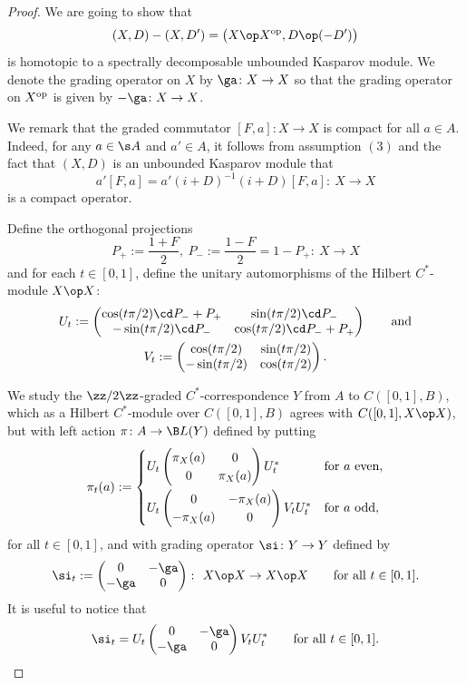\begin{proof}
We are going to show that
\[
(X,D) - (X, D') = \big(X \op X^{{\rm op}}, D \op (- D') \big)
\]
is homotopic to a spectrally decomposable unbounded Kasparov module. We denote the grading operator on $X$ by $\ga\colon X \to X$ so that the grading operator on $X^{{\rm op}}$ is given by $-\ga\colon X \to X$.

We remark that the graded commutator $[F,a]\colon X \to X$ is compact for all $a \in A$. Indeed, for any $a \in \s A$ and $a' \in A$, it follows from assumption $(3)$ and the fact that $(X,D)$ is an unbounded Kasparov module that
\[
a' [F,a] = a' (i + D)^{-1} (i + D) [F,a]\colon \ X \to X
\]
is a compact operator.

Define the orthogonal projections
\[
P_+ := \frac{1 + F}{2} , \ P_- := \frac{1 - F}{2} = 1 - P_+\colon \ X \to X
\]
and for each $t \in [0,1]$, define the unitary automorphisms of the Hilbert $C^*$-module $X \op X$:
\begin{gather}
U_t := \left(\begin{matrix} \cos(t \pi/ 2) \cd P_- + P_+ & \sin(t \pi/2) \cd P_- \\ - \sin(t \pi/2) \cd P_- & \cos(t \pi/2) \cd P_- + P_+\end{matrix}\right) \qquad \text{and} \nonumber\\
V_t := \left(\begin{matrix} \cos(t \pi/ 2) & \sin(t \pi/2) \\ - \sin(t \pi/2) & \cos(t \pi/2) \end{matrix}\right) .\label{eq:unitary}
\end{gather}

We study the $\zz/2\zz$-graded $C^*$-correspondence $Y$ from $A$ to $C([0,1],B)$, which as a Hilbert $C^*$-module over $C([0,1],B)$ agrees with $C( [0,1],X \op X)$, but with left action $\pi\colon A \to \B L(Y)$ defined by putting
\[
\pi_t(a) := \begin{cases} U_t \left(\begin{matrix}\pi_X(a) & 0 \\ 0 & \pi_X(a)\end{matrix}\right) U_t^* & \text{for} \ a \text{ even}, \vspace{1mm}\\
U_t \left(\begin{matrix}0 & -\pi_X(a) \\ -\pi_X(a) & 0\end{matrix}\right) V_t U_t^*
& \text{for} \ a \text{ odd} ,\end{cases}
\]
for all $t \in [0,1]$, and with grading operator $\si\colon Y \to Y$ defined by
\[
\si_t := \left(\begin{matrix} 0 & - \ga \\ - \ga & 0\end{matrix}\right) \colon \ X \op X \to X \op X \qquad \text{for all } t \in [0,1] .
\]
It is useful to notice that
\[
\si_t = U_t \left(\begin{matrix} 0 & - \ga \\ -\ga & 0\end{matrix}\right) V_t U_t^* \qquad \text{for all } t \in [0,1] .
\]


\end{proof}

